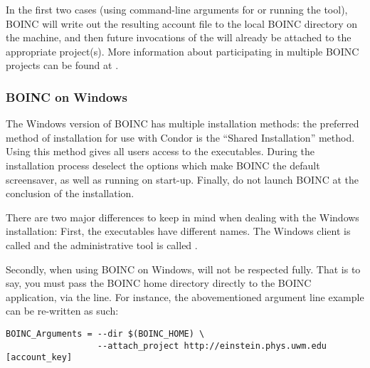 In the first two cases (using command-line arguments for
 or running the  tool), BOINC
will write out the resulting account file to the local BOINC directory
on the machine, and then future invocations of the
 will already be attached to the appropriate
project(s).
More information about participating in multiple BOINC projects can be
found at .

\subsubsection{\label{sec:Backfill-BOINC-Windows}BOINC on Windows}

The Windows version of BOINC has multiple installation methods: the 
preferred method of installation for use with Condor is the 
``Shared Installation'' method.  Using this method gives all users 
access to the executables.  During the installation process 
deselect the options which make BOINC the default screensaver, as well 
as running on start-up.  Finally, do not launch BOINC at the conclusion
of the installation.

There are two major differences to keep in mind when dealing with 
the Windows installation: First, the executables have different names.  
The Windows client is called  and the administrative 
tool is called .
  
Secondly, when using BOINC on Windows,  will not 
be respected fully.  That is to say, you must pass the BOINC home 
directory directly to the BOINC application, via the 
line. For instance, the abovementioned argument line example can be 
re-written as such:

\footnotesize
\begin{verbatim}
BOINC_Arguments = --dir $(BOINC_HOME) \
                  --attach_project http://einstein.phys.uwm.edu [account_key] 
\end{verbatim}
\normalsize

